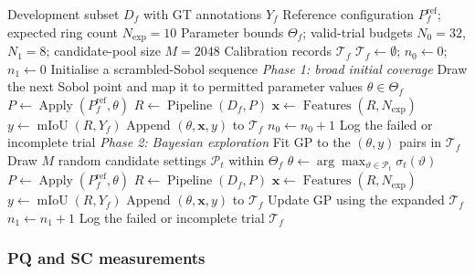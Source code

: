 \documentclass[a4paper,fleqn]{cas-dc}
\begin{document}
{\begin{algorithm}[ht]
\caption{Generating calibration examples through space-filling
sampling and Bayesian exploration}
\label{alg:bo_exploration}
\begin{algorithmic}[1]
\Require Development subset $D_f$ with GT annotations $Y_f$
\Require Reference configuration $P_f^{\mathrm{ref}}$; expected ring count $N_{\mathrm{exp}}=10$
\Require Parameter bounds $\Theta_f$;
         valid-trial budgets $N_0=32$, $N_1=8$;
         candidate-pool size $M=2048$
\Ensure Calibration records $\mathcal{T}_f$
\State $\mathcal{T}_f\gets\emptyset$;
       $n_0\gets0$; $n_1\gets0$
\State Initialise a scrambled-Sobol sequence
\Statex \textit{Phase 1: broad initial coverage}
    \State Draw the next Sobol point and map it to
           permitted parameter values $\theta\in\Theta_f$
    \State $P\gets\operatorname{Apply}
           (P_f^{\mathrm{ref}},\theta)$
    \State $R\gets\operatorname{Pipeline}(D_f,P)$
        \State $\mathbf{x}\gets\operatorname{Features}(R,N_{\mathrm{exp}})$
        \State $y\gets\operatorname{mIoU}(R,Y_f)$
        \State Append $(\theta,\mathbf{x},y)$
               to $\mathcal{T}_f$
        \State $n_0\gets n_0+1$
    \Else
        \State Log the failed or incomplete trial
    \EndIf
\EndWhile
\Statex \textit{Phase 2: Bayesian exploration}
\State Fit GP to the $(\theta,y)$ pairs in $\mathcal{T}_f$
    \State Draw $M$ random candidate settings
           $\mathcal{P}_t$ within $\Theta_f$
    \State $\theta\gets
           \arg\max_{\vartheta\in\mathcal{P}_t}
           \sigma_t(\vartheta)$
    \State $P\gets\operatorname{Apply}
           (P_f^{\mathrm{ref}},\theta)$
    \State $R\gets\operatorname{Pipeline}(D_f,P)$
        \State $\mathbf{x}\gets\operatorname{Features}(R,N_{\mathrm{exp}})$
        \State $y\gets\operatorname{mIoU}(R,Y_f)$
        \State Append $(\theta,\mathbf{x},y)$
               to $\mathcal{T}_f$
        \State Update GP using the expanded $\mathcal{T}_f$
        \State $n_1\gets n_1+1$
    \Else
        \State Log the failed or incomplete trial
    \EndIf
\EndWhile
\State \Return $\mathcal{T}_f$
\end{algorithmic}
\end{algorithm}

\subsubsection{PQ and SC measurements}
\label{sec:features}

}
\end{document}

